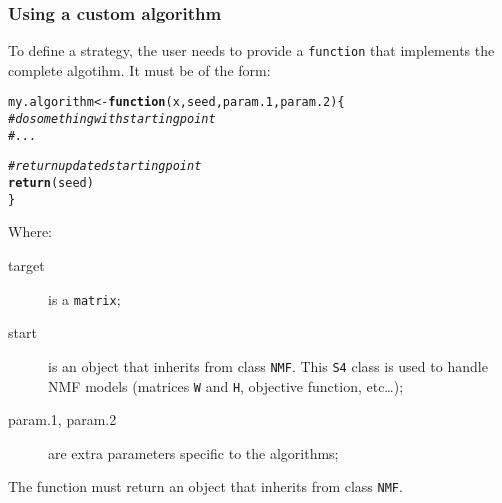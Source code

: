 \documentclass[a4paper]{article}\usepackage[]{graphicx}\usepackage[]{color}
\makeatletter
\newcommand{\hlcom}[1]{\textcolor[rgb]{0.678,0.584,0.686}{\textit{#1}}}%
\newcommand{\hlstd}[1]{\textcolor[rgb]{0.345,0.345,0.345}{#1}}%
\newcommand{\hlkwa}[1]{\textcolor[rgb]{0.161,0.373,0.58}{\textbf{#1}}}%
\newcommand{\hlkwb}[1]{\textcolor[rgb]{0.69,0.353,0.396}{#1}}%
\newcommand{\hlkwc}[1]{\textcolor[rgb]{0.333,0.667,0.333}{#1}}%
\newcommand{\hlkwd}[1]{\textcolor[rgb]{0.737,0.353,0.396}{\textbf{#1}}}%
\newenvironment{kframe}{%
 \def\at@end@of@kframe{}%
 \ifinner\ifhmode%
  \def\at@end@of@kframe{\end{minipage}}%
  \begin{minipage}{\columnwidth}%
 \fi\fi%
 \def\FrameCommand##1{\hskip\@totalleftmargin \hskip-\fboxsep
 \colorbox{shadecolor}{##1}\hskip-\fboxsep
     \hskip-\linewidth \hskip-\@totalleftmargin \hskip\columnwidth}%
 \MakeFramed {\advance\hsize-\width
   \@totalleftmargin\z@ \linewidth\hsize
   \@setminipage}}%
 {\par\unskip\endMakeFramed%
 \at@end@of@kframe}
\newenvironment{knitrout}{}{} %
\let\code=\texttt
\makeatother
\begin{document}
\subsubsection{Using a custom algorithm}\label{sec:algo_custom}
To define a strategy, the user needs to provide a \code{function} that implements the complete algotihm. It must be of the form: 

\begin{knitrout}
\color{fgcolor}\begin{kframe}
\begin{alltt}
\hlstd{my.algorithm} \hlkwb{<-} \hlkwa{function}\hlstd{(}\hlkwc{x}\hlstd{,} \hlkwc{seed}\hlstd{,} \hlkwc{param.1}\hlstd{,} \hlkwc{param.2}\hlstd{)\{}
        \hlcom{# do something with starting point}
        \hlcom{# ...}

        \hlcom{# return updated starting point}
        \hlkwd{return}\hlstd{(seed)}
\hlstd{\}}
\end{alltt}
\end{kframe}
\end{knitrout}
Where:

\begin{description}
\item[target] is a \code{matrix}; 
\item[start] is an object that inherits from class \code{NMF}. 
This \code{S4} class is used to handle NMF models (matrices \code{W} and \code{H}, objective function, etc\dots);
\item[param.1, param.2] are extra parameters specific to the algorithms;
\end{description}

The function must return an object that inherits from class \code{NMF}.
\end{document}
